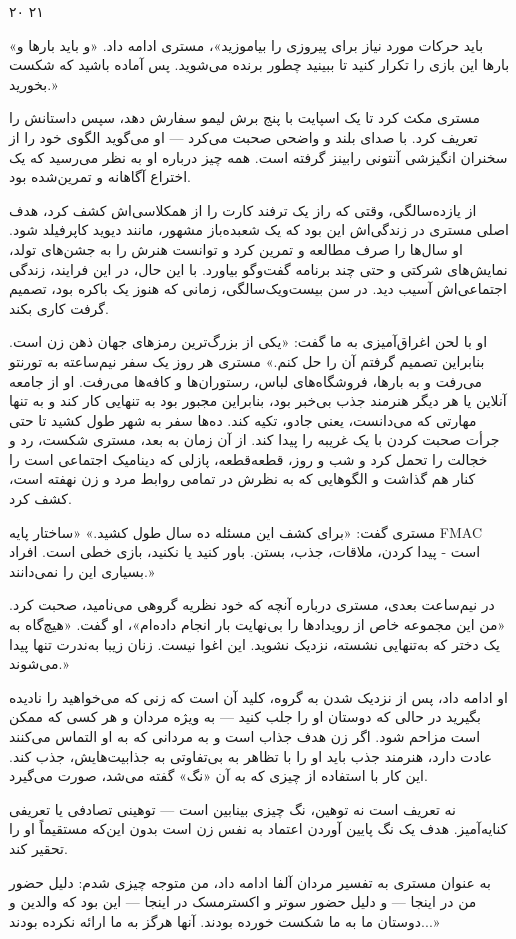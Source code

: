 ۲۰ ۲۱

«باید حرکات مورد نیاز برای پیروزی را بیاموزید»، مستری ادامه داد. «و باید بارها و بارها این بازی را تکرار کنید تا ببینید چطور برنده می‌شوید. پس آماده باشید که شکست بخورید.»

مستری مکث کرد تا یک اسپایت با پنج برش لیمو سفارش دهد، سپس داستانش را تعریف کرد. با صدای بلند و واضحی صحبت می‌کرد — او می‌گوید الگوی خود را از سخنران انگیزشی آنتونی رابینز گرفته است. همه چیز درباره او به نظر می‌رسید که یک اختراع آگاهانه و تمرین‌شده بود.

از یازده‌سالگی، وقتی که راز یک ترفند کارت را از همکلاسی‌اش کشف کرد، هدف اصلی مستری در زندگی‌اش این بود که یک شعبده‌باز مشهور، مانند دیوید کاپرفیلد شود. او سال‌ها را صرف مطالعه و تمرین کرد و توانست هنرش را به جشن‌های تولد، نمایش‌های شرکتی و حتی چند برنامه گفت‌وگو بیاورد. با این حال، در این فرایند، زندگی اجتماعی‌اش آسیب دید. در سن بیست‌ویک‌سالگی، زمانی که هنوز یک باکره بود، تصمیم گرفت کاری بکند.

او با لحن اغراق‌آمیزی به ما گفت: «یکی از بزرگ‌ترین رمزهای جهان ذهن زن است. بنابراین تصمیم گرفتم آن را حل کنم.» مستری هر روز یک سفر نیم‌ساعته به تورنتو می‌رفت و به بارها، فروشگاه‌های لباس، رستوران‌ها و کافه‌ها می‌رفت. او از جامعه آنلاین یا هر دیگر هنرمند جذب بی‌خبر بود، بنابراین مجبور بود به تنهایی کار کند و به تنها مهارتی که می‌دانست، یعنی جادو، تکیه کند. ده‌ها سفر به شهر طول کشید تا حتی جرأت صحبت کردن با یک غریبه را پیدا کند. از آن زمان به بعد، مستری شکست، رد و خجالت را تحمل کرد و شب و روز، قطعه‌قطعه، پازلی که دینامیک اجتماعی است را کنار هم گذاشت و الگوهایی که به نظرش در تمامی روابط مرد و زن نهفته است، کشف کرد.

مستری گفت: «برای کشف این مسئله ده سال طول کشید.» «ساختار پایه FMAC است - پیدا کردن، ملاقات، جذب، بستن. باور کنید یا نکنید، بازی خطی است. افراد بسیاری این را نمی‌دانند.»

در نیم‌ساعت بعدی، مستری درباره آنچه که خود نظریه گروهی می‌نامید، صحبت کرد. «من این مجموعه خاص از رویدادها را بی‌نهایت بار انجام داده‌ام»، او گفت. «هیچ‌گاه به یک دختر که به‌تنهایی نشسته، نزدیک نشوید. این اغوا نیست. زنان زیبا به‌ندرت تنها پیدا می‌شوند.»

او ادامه داد، پس از نزدیک شدن به گروه، کلید آن است که زنی که می‌خواهید را نادیده بگیرید در حالی که دوستان او را جلب کنید — به ویژه مردان و هر کسی که ممکن است مزاحم شود. اگر زن هدف جذاب است و به مردانی که به او التماس می‌کنند عادت دارد، هنرمند جذب باید او را با تظاهر به بی‌تفاوتی به جذابیت‌هایش، جذب کند. این کار با استفاده از چیزی که به آن «نگ» گفته می‌شد، صورت می‌گیرد.

نه تعریف است نه توهین، نگ چیزی بینابین است — توهینی تصادفی یا تعریفی کنایه‌آمیز. هدف یک نگ پایین آوردن اعتماد به نفس زن است بدون این‌که مستقیماً او را تحقیر کند.

به عنوان مستری به تفسیر مردان آلفا ادامه داد، من متوجه چیزی شدم: دلیل حضور من در اینجا — و دلیل حضور سوتر و اکسترمسک در اینجا — این بود که والدین و دوستان ما به ما شکست خورده بودند. آنها هرگز به ما ارائه نکرده بودند...»